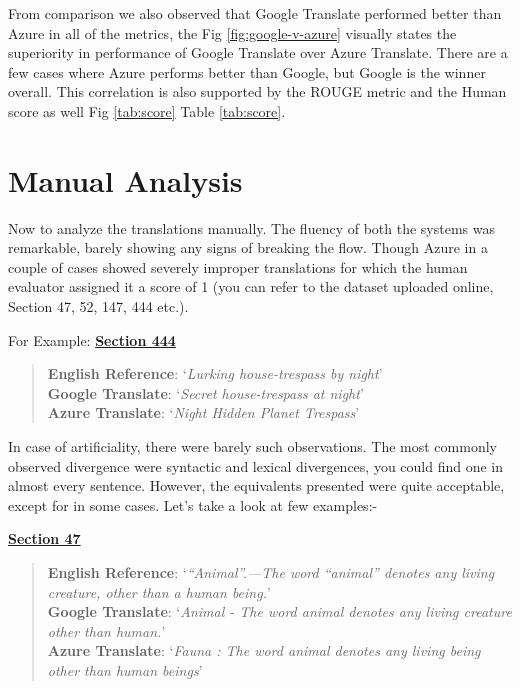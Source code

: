 From comparison we also observed that Google Translate performed better than Azure in all of the metrics, the Fig \ref{fig:google-v-azure} visually states the superiority in performance of Google Translate over Azure Translate. There are a few cases where Azure performs better than Google, but Google is the winner overall. This correlation is also supported by the ROUGE metric and the Human score as well Fig \ref{tab:score} Table \ref{tab:score}.

\section{Manual Analysis}

Now to analyze the translations manually. The fluency of both the systems was remarkable, barely showing any signs of breaking the flow. Though Azure in a couple of cases showed severely improper translations for which the human evaluator assigned it a score of 1 (you can refer to the dataset uploaded online, Section 47, 52, 147, 444 etc.). 

\singlespacing
For Example: \underline{\textbf{Section 444}}
\begin{quote}
    \textbf{English Reference}: `\textit{Lurking house-trespass by night}'\\
    \textbf{Google Translate}: `\textit{Secret house-trespass at night}'\\
    \textbf{Azure Translate}: `\textit{Night Hidden Planet Trespass}'
\end{quote}
\doublespacing

In case of artificiality, there were barely such observations. The most commonly observed divergence were syntactic and lexical divergences, you could find one in almost every sentence. However, the equivalents presented were quite acceptable, except for in some cases. Let's take a look at few examples:-

\singlespacing
\underline{\textbf{Section 47}}
\begin{quote}
    \textbf{English Reference}: `\textit{“Animal”.—The word “animal” denotes any living creature, other than a human being.}'\\
    \textbf{Google Translate}: `\textit{Animal - The word animal denotes any living creature other than human.}'\\
    \textbf{Azure Translate}: `\textit{Fauna : The word animal denotes any living being other than human beings}'
\end{quote}

